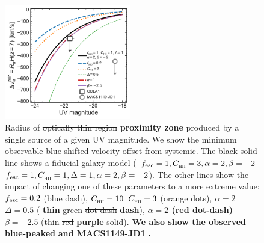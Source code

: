 \documentclass[fleqn,usenatbib]{mnras}
\providecommand{\DIFadd}[1]{{\protect\color{Green} \bf #1}} %
\providecommand{\DIFdel}[1]{{\protect\color{lightgray} \footnotesize \sout{#1}}} %
\providecommand{\DIFaddFL}[1]{\DIFadd{#1}} %
\providecommand{\DIFdelFL}[1]{\DIFdel{#1}} %
\providecommand{\DIFaddbeginFL}{} %
\providecommand{\DIFaddendFL}{} %
\providecommand{\DIFdelbeginFL}{} %
\providecommand{\DIFdelendFL}{} %
\newcommand{\DIFscaledelfig}{0.5}
\newlength{\DIFdelgraphicswidth} %
\newlength{\DIFdelgraphicsheight} %
\newcommand{\DIFaddincludegraphics}[2][]{{\color{blue}\fbox{\DIFOincludegraphics[#1]{#2}}}} %
\newcommand{\DIFdelincludegraphics}[2][]{%
\sbox{\DIFdelgraphicsbox}{\DIFOincludegraphics[#1]{#2}}%
\settoboxwidth{\DIFdelgraphicswidth}{\DIFdelgraphicsbox} %
\settoboxtotalheight{\DIFdelgraphicsheight}{\DIFdelgraphicsbox} %
\scalebox{\DIFscaledelfig}{%
\parbox[b]{\DIFdelgraphicswidth}{\usebox{\DIFdelgraphicsbox}\\[-\baselineskip] \rule{\DIFdelgraphicswidth}{0em}}\llap{\resizebox{\DIFdelgraphicswidth}{\DIFdelgraphicsheight}{%
\setlength{\unitlength}{\DIFdelgraphicswidth}%
\begin{picture}(1,1)%
\thicklines\linethickness{2pt} %
{\color[rgb]{1,0,0}\put(0,0){\framebox(1,1){}}}%
{\color[rgb]{1,0,0}\put(0,0){\line( 1,1){1}}}%
{\color[rgb]{1,0,0}\put(0,1){\line(1,-1){1}}}%
\end{picture}%
}\hspace*{3pt}}} %
} %
\DeclareRobustCommand{\DIFaddbeginFL}{\DIFOaddbeginFL \let\includegraphics\DIFaddincludegraphics} %
\DeclareRobustCommand{\DIFaddendFL}{\DIFOaddendFL \let\includegraphics\DIFOincludegraphics} %
\DeclareRobustCommand{\DIFdelbeginFL}{\DIFOdelbeginFL \let\includegraphics\DIFdelincludegraphics} %
\DeclareRobustCommand{\DIFdelendFL}{\DIFOaddendFL \let\includegraphics\DIFOincludegraphics} %
\begin{document}
\begin{figure}
    \includegraphics[width=0.49\textwidth]{figs/fig6.pdf}
    \caption{Radius of \DIFdelbeginFL \DIFdelFL{optically thin region }\DIFdelendFL \DIFaddbeginFL \DIFaddFL{proximity zone }\DIFaddendFL produced by a single source of a given UV magnitude. We show the minimum observable blue-shifted velocity offset from systemic. The black solid line shows a fiducial galaxy model (\DIFdelbeginFL \DIFdelFL{$\fesc=1, \clump=3, \alpha=2, \beta=-2$}\DIFdelendFL \DIFaddbeginFL \DIFaddFL{$\fesc=1, \clump=1, \Delta=1, \alpha=2, \beta=-2$}\DIFaddendFL ). The other lines show the impact of changing one of these parameters to a more extreme value: $\fesc=0.2$ (blue dash), \DIFdelbeginFL \DIFdelFL{$\clump=10$ }\DIFdelendFL \DIFaddbeginFL \DIFaddFL{$\clump=3$ }\DIFaddendFL (orange dots), \DIFdelbeginFL \DIFdelFL{$\alpha=2$ }\DIFdelendFL \DIFaddbeginFL \DIFaddFL{$\Delta=0.5$ }\DIFaddendFL (\DIFaddbeginFL \DIFaddFL{thin }\DIFaddendFL green \DIFdelbeginFL \DIFdelFL{dot-dash}\DIFdelendFL \DIFaddbeginFL \DIFaddFL{dash}\DIFaddendFL ), \DIFaddbeginFL \DIFaddFL{$\alpha=2$ (red dot-dash) }\DIFaddendFL $\beta=-2.5$ (thin \DIFdelbeginFL \DIFdelFL{red }\DIFdelendFL \DIFaddbeginFL \DIFaddFL{purple }\DIFaddendFL solid). \DIFaddbeginFL \DIFaddFL{We also show the observed blue-peaked }\lya \DIFaddFL{emitters COLA1 }\citep{Hu2016,Matthee2018b} \DIFaddFL{and MACS1149-JD1 }\citep{Hashimoto2018a}\DIFaddFL{.}\DIFaddendFL }
    \label{fig:R_opticallythin}
\end{figure}
\end{document}
